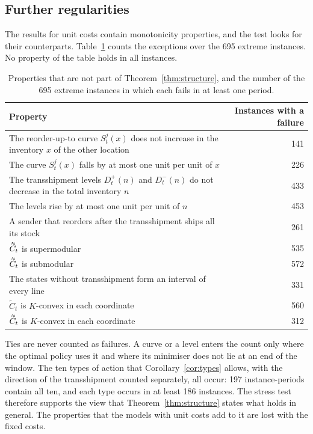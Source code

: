 \documentclass[11pt]{article}
\DeclareRobustCommand{\dbtilde}[1]{\accentset{\approx}{#1}}
\newcommand{\Ct}{\widetilde{C}}
\newcommand{\Cq}{\dbtilde{C}}
\theoremstyle{definition}
\begin{document}
\subsection{Further regularities}\label{sec:regular}

The results for unit costs contain monotonicity properties, and the test looks for their counterparts. Table~\ref{tab:regular} counts the exceptions over the 695 extreme instances. No property of the table holds in all instances.

\begin{table}[h]
\centering
\small
\caption{Properties that are not part of Theorem~\ref{thm:structure}, and the number of the 695 extreme instances in which each fails in at least one period.}\label{tab:regular}
\begin{tabular}{p{11.2cm}r}
\toprule
Property & Instances with a failure \\
\midrule
The reorder-up-to curve $S^j_t(x)$ does not increase in the inventory $x$ of the other location & 141 \\
The curve $S^j_t(x)$ falls by at most one unit per unit of $x$ & 226 \\
The transshipment levels $D^+_t(n)$ and $D^-_t(n)$ do not decrease in the total inventory $n$ & 433 \\
The levels rise by at most one unit per unit of $n$ & 453 \\
A sender that reorders after the transshipment ships all its stock & 261 \\
$\Cq_t$ is supermodular & 535 \\
$\Cq_t$ is submodular & 572 \\
The states without transshipment form an interval of every line & 331 \\
$\Ct_t$ is $K$-convex in each coordinate & 560 \\
$\Cq_t$ is $K$-convex in each coordinate & 312 \\
\bottomrule
\end{tabular}
\end{table}

Ties are never counted as failures. A curve or a level enters the count only where the optimal policy uses it and where its minimiser does not lie at an end of the window. The ten types of action that Corollary~\ref{cor:types} allows, with the direction of the transshipment counted separately, all occur: 197 instance-periods contain all ten, and each type occurs in at least 186 instances. The stress test therefore supports the view that Theorem~\ref{thm:structure} states what holds in general. The properties that the models with unit costs add to it are lost with the fixed costs.
\end{document}
